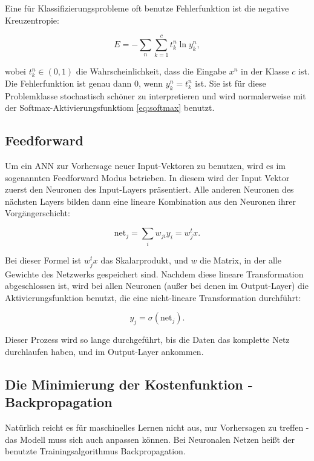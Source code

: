 Eine für Klassifizierungsprobleme oft benutze Fehlerfunktion ist die negative Kreuzentropie:

\begin{equation}
\label{eq:crossEntropy}
    E = -\sum_{n} \sum_{k=1}^c t_k^n \ln y_k^n ,
\end{equation}

wobei $t_k^n \in (0,1)$ die Wahrscheinlichkeit, dass die Eingabe $x^n$ in der Klasse $c$ ist. Die Fehlerfunktion ist genau dann $0$, wenn $y_k^n = t_k^n$ ist. 
Sie ist für diese Problemklasse stochastisch schöner zu interpretieren und wird normalerweise mit der Softmax-Aktivierungsfunktiom \ref{eq:softmax} benutzt. \cite{bishop1995neural}

\subsection{Feedforward}
Um ein ANN zur Vorhersage neuer Input-Vektoren zu benutzen, wird es im sogenannten Feedforward Modus betrieben. In diesem wird der Input Vektor zuerst den Neuronen des Input-Layers präsentiert. Alle anderen Neuronen des nächsten Layers bilden dann eine lineare Kombination aus den Neuronen ihrer Vorgängerschicht: 

\begin{equation}
\label{eq:feedforward1}
\text{net}_j = \sum_{i} w_{ji} y_i = w_j^t x.
\end{equation}

Bei dieser Formel ist $w_j^t x$ das Skalarprodukt, und $w$ die Matrix, in der alle Gewichte des Netzwerks gespeichert sind.  
Nachdem diese lineare Transformation abgeschlossen ist, wird bei allen Neuronen (außer bei denen im Output-Layer) die Aktivierungsfunktion benutzt, die eine nicht-lineare Transformation durchführt: 

\begin{equation}
\label{eq:feedforward2}
y_j = \sigma (\text{net}_j).
\end{equation}

Dieser Prozess wird so lange durchgeführt, bis die Daten das komplette Netz durchlaufen haben, und im Output-Layer ankommen\cite{bishop1995neural}.


\subsection{Die Minimierung der Kostenfunktion - Backpropagation}

Natürlich reicht es für maschinelles Lernen nicht aus, nur Vorhersagen zu treffen - das Modell muss sich auch anpassen können. Bei Neuronalen Netzen heißt der benutzte Trainingsalgorithmus Backpropagation.

